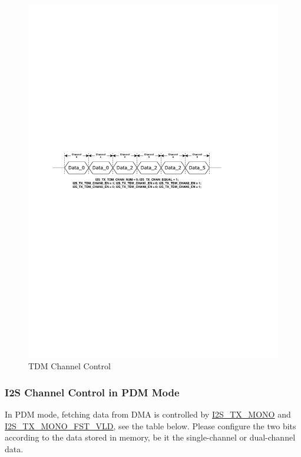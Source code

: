 \documentclass[main\_\_CN.tex]{subfiles}
\begin{document}
\begin{figure}[H]
    \centering
    \includegraphics[width=1.0\textwidth]{03-I2S/figures/i2s_tdm_channel_config.pdf}
    \caption{TDM Channel Control}
    \label{Figure:i2s_tdm_channel_control}
\end{figure}


\subsubsection{I2S Channel Control in PDM Mode}
In PDM mode, fetching data from DMA is controlled by \hyperref[fielddesc:I2STXMONO]{I2S\_TX\_MONO} and  \hyperref[fielddesc:I2STXMONOFSTVLD]{I2S\_TX\_MONO\_FST\_VLD}, see the table below. Please configure the two bits according to the data stored in memory, be it the single-channel or dual-channel data.
\end{document}
